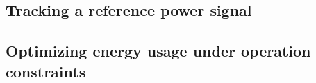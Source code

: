 \subsection{Tracking a reference power signal}


\begin{figure}[h!]
	\centering
	\missingfigure[figwidth=20pc]{}
	\caption{}
	\captionsetup{justification=centering}
	\label{F:}
\end{figure}

\subsection{Optimizing energy usage under operation constraints}


\begin{figure}[h!]
	\centering
	\missingfigure[figwidth=20pc]{}
	\caption{}
	\captionsetup{justification=centering}
	\label{F:}
\end{figure}